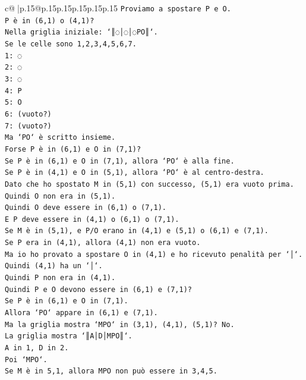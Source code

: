 \documentclass{article}
\begin{document}
{\begin{supertabular}{c@{$\;$}|p{.15\linewidth}@{}p{.15\linewidth}p{.15\linewidth}p{.15\linewidth}p{.15\linewidth}p{.15\linewidth}}
{{{\texttt{Proviamo a spostare P e O.} \\
\texttt{P è in (6,1) o (4,1)?} \\
\texttt{Nella griglia iniziale: `║◌│◌│◌PO║`.} \\
\texttt{Se le celle sono 1,2,3,4,5,6,7.} \\
\texttt{1: ◌} \\
\texttt{2: ◌} \\
\texttt{3: ◌} \\
\texttt{4: P} \\
\texttt{5: O} \\
\texttt{6: (vuoto?)} \\
\texttt{7: (vuoto?)} \\
\texttt{Ma `PO` è scritto insieme.} \\
\texttt{Forse P è in (6,1) e O in (7,1)?} \\
\texttt{Se P è in (6,1) e O in (7,1), allora `PO` è alla fine.} \\
\texttt{Se P è in (4,1) e O in (5,1), allora `PO` è al centro{-}destra.} \\
\texttt{Dato che ho spostato M in (5,1) con successo, (5,1) era vuoto prima.} \\
\texttt{Quindi O non era in (5,1).} \\
\texttt{Quindi O deve essere in (6,1) o (7,1).} \\
\texttt{E P deve essere in (4,1) o (6,1) o (7,1).} \\
\texttt{Se M è in (5,1), e P/O erano in (4,1) e (5,1) o (6,1) e (7,1).} \\
\texttt{Se P era in (4,1), allora (4,1) non era vuoto.} \\
\texttt{Ma io ho provato a spostare O in (4,1) e ho ricevuto penalità per `│`.} \\
\texttt{Quindi (4,1) ha un `│`.} \\
\texttt{Quindi P non era in (4,1).} \\
\texttt{Quindi P e O devono essere in (6,1) e (7,1)?} \\
\texttt{Se P è in (6,1) e O in (7,1).} \\
\texttt{Allora `PO` appare in (6,1) e (7,1).} \\
\texttt{Ma la griglia mostra `MPO` in (3,1), (4,1), (5,1)? No.} \\
\texttt{La griglia mostra `║A│D│MPO║`.} \\
\texttt{A in 1, D in 2.} \\
\texttt{Poi `MPO`.} \\
\texttt{Se M è in 5,1, allora MPO non può essere in 3,4,5.} \\
}}}
\end{supertabular}}
\end{document}
